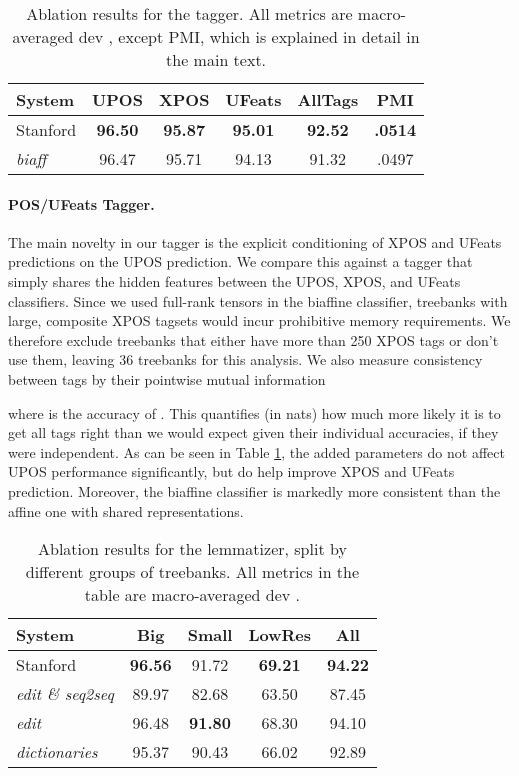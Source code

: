 \documentclass[11pt,a4paper]{article}
\newcommand{\fone}{}
\begin{document}
\begin{table}[t]
  \centering
  \small
  \setlength{\tabcolsep}{0.4em}
  \begin{tabular}{lccccc}
  \toprule
  System & UPOS & XPOS & UFeats & AllTags & PMI\\
  \midrule
  Stanford & \textbf{96.50} & \textbf{95.87} & \textbf{95.01} & \textbf{92.52} & {\small \textbf{.0514}}\\
   \textit{biaff} & 96.47 & 95.71 & 94.13 & 91.32 & {\small .0497}\\
  \bottomrule
  \end{tabular}
  \caption{Ablation results for the tagger. All metrics are macro-averaged dev \fone{}, except PMI, which is explained in detail in the main text.}\label{tab:tagger_ablation}
  \end{table}

\paragraph{POS/UFeats Tagger.}
The main novelty in our tagger is the explicit conditioning of XPOS and UFeats predictions on the UPOS prediction. We compare this against a tagger that simply shares the hidden features between the UPOS, XPOS, and UFeats classifiers.
Since we used full-rank tensors in the biaffine classifier, treebanks with large, composite XPOS tagsets would incur prohibitive memory requirements.
We therefore exclude treebanks that either have more than 250 XPOS tags or don't use them, leaving 36 treebanks for this analysis.
We also measure consistency between tags by their pointwise mutual information

where  is the accuracy of .
This quantifies (in nats) how much more likely it is to get all tags right than we would expect given their individual accuracies, if they were independent.
As can be seen in Table \ref{tab:tagger_ablation}, the added parameters do not affect UPOS performance significantly, but do help improve XPOS and UFeats prediction. Moreover, the biaffine classifier is markedly more consistent than the affine one with shared representations.







\begin{table}
\centering
\small
\setlength{\tabcolsep}{0.3em}
\begin{tabular}{lcccc}
\toprule
System & Big & Small & LowRes & All \\
\midrule
Stanford & \textbf{96.56} & 91.72 & \textbf{69.21} & \textbf{94.22} \\
 \textit{edit \& seq2seq} & 89.97 & 82.68 & 63.50 & 87.45\\
 \textit{edit} & 96.48 & \textbf{91.80} & 68.30 & 94.10\\
 \textit{dictionaries} & 95.37 & 90.43 & 66.02 & 92.89\\
\bottomrule
\end{tabular}
\caption{Ablation results for the lemmatizer, split by different groups of treebanks. All metrics in the table are macro-averaged dev \fone{}.}
\label{tab:lemma_ablation}
\end{table}
\end{document}

